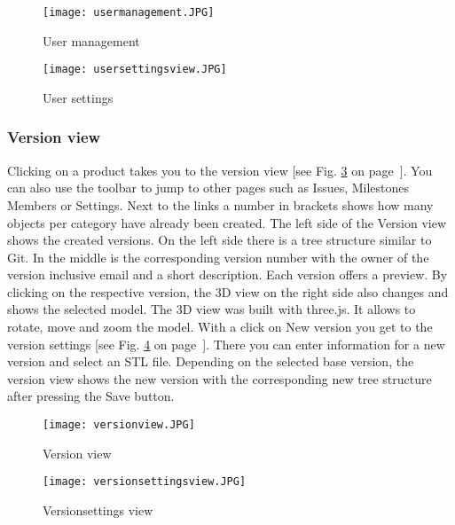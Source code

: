    \begin{figure}[h]
        \centering
        \texttt{[image: usermanagement.JPG]}
        \caption{User management}
        \label{fig: usermanagement}
    \end{figure}


    \begin{figure}[h]
        \centering
        \texttt{[image: usersettingsview.JPG]}
        \caption{User settings}
        \label{fig: usersettingsview}
    \end{figure}


    \subsubsection*{Version view}
    Clicking on a product takes you to the version view [see Fig. \ref{fig: versionview} on page~\pageref{fig: versionview}]. You can also use the toolbar to jump to other pages such as Issues, Milestones Members or Settings. Next to the links a number in brackets shows how many objects per category have already been created. The left side of the Version view shows the created versions. On the left side there is a tree structure similar to Git. In the middle is the corresponding version number with the owner of the version inclusive email and a short description. Each version offers a preview. By clicking on the respective version, the 3D view on the right side also changes and shows the selected model. The 3D view was built with three.js. It allows to rotate, move and zoom the model. With a click on New version you get to the version settings [see Fig. \ref{fig: versionsettingsview} on page~\pageref{fig: versionsettingsview}]. There you can enter information for a new version and select an STL file. Depending on the selected base version, the version view shows the new version with the corresponding new tree structure after pressing the Save button.
    
    \begin{figure}[h]
        \centering
        \texttt{[image: versionview.JPG]}
        \caption{Version view}
        \label{fig: versionview}
    \end{figure}

    \begin{figure}[h]
        \centering
        \texttt{[image: versionsettingsview.JPG]}
        \caption{Versionsettings view}
        \label{fig: versionsettingsview}
    \end{figure}


